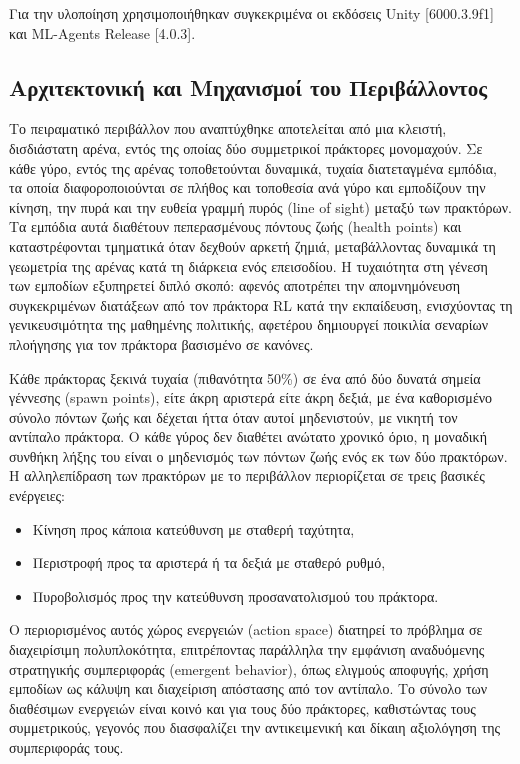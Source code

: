 \documentclass[12pt]{article}
\begin{document}
Για την υλοποίηση χρησιμοποιήθηκαν συγκεκριμένα οι εκδόσεις Unity [6000.3.9f1] και ML-Agents Release [4.0.3].

\subsection{Αρχιτεκτονική και Μηχανισμοί του Περιβάλλοντος}
Το πειραματικό περιβάλλον που αναπτύχθηκε αποτελείται από μια κλειστή, δισδιάστατη αρένα, εντός της οποίας δύο συμμετρικοί πράκτορες μονομαχούν. Σε κάθε γύρο, εντός της αρένας τοποθετούνται δυναμικά, τυχαία διατεταγμένα εμπόδια, τα οποία διαφοροποιούνται σε πλήθος και τοποθεσία ανά γύρο και εμποδίζουν την κίνηση, την πυρά και την ευθεία γραμμή πυρός (line of sight) μεταξύ των πρακτόρων. Τα εμπόδια αυτά διαθέτουν πεπερασμένους πόντους ζωής (health points) και καταστρέφονται τμηματικά όταν δεχθούν αρκετή ζημιά, μεταβάλλοντας δυναμικά τη γεωμετρία της αρένας κατά τη διάρκεια ενός επεισοδίου. Η τυχαιότητα στη γένεση των εμποδίων εξυπηρετεί διπλό σκοπό: αφενός αποτρέπει την απομνημόνευση συγκεκριμένων διατάξεων από τον πράκτορα RL κατά την εκπαίδευση, ενισχύοντας τη γενικευσιμότητα της μαθημένης πολιτικής, αφετέρου δημιουργεί ποικιλία σεναρίων πλοήγησης για τον πράκτορα βασισμένο σε κανόνες.

Κάθε πράκτορας ξεκινά τυχαία (πιθανότητα 50\%) σε ένα από δύο δυνατά σημεία γέννεσης (spawn points), είτε άκρη αριστερά είτε άκρη δεξιά, με ένα καθορισμένο σύνολο πόντων ζωής και δέχεται ήττα όταν αυτοί μηδενιστούν, με νικητή τον αντίπαλο πράκτορα. Ο κάθε γύρος δεν διαθέτει ανώτατο χρονικό όριο, η μοναδική συνθήκη λήξης του είναι ο μηδενισμός των πόντων ζωής ενός εκ των δύο πρακτόρων. Η αλληλεπίδραση των πρακτόρων με το περιβάλλον περιορίζεται σε τρεις βασικές ενέργειες:

\begin{itemize}
    \item Κίνηση προς κάποια κατεύθυνση με σταθερή ταχύτητα,
    \item Περιστροφή προς τα αριστερά ή τα δεξιά με σταθερό ρυθμό,
    \item Πυροβολισμός προς την κατεύθυνση προσανατολισμού του πράκτορα.
\end{itemize}

Ο περιορισμένος αυτός χώρος ενεργειών (action space) διατηρεί το πρόβλημα σε διαχειρίσιμη πολυπλοκότητα, επιτρέποντας παράλληλα την εμφάνιση αναδυόμενης στρατηγικής συμπεριφοράς (emergent behavior), όπως ελιγμούς αποφυγής, χρήση εμποδίων ως κάλυψη και διαχείριση απόστασης από τον αντίπαλο. Το σύνολο των διαθέσιμων ενεργειών είναι κοινό και για τους δύο πράκτορες, καθιστώντας τους συμμετρικούς, γεγονός που διασφαλίζει την αντικειμενική και δίκαιη αξιολόγηση της συμπεριφοράς τους.
\end{document}
